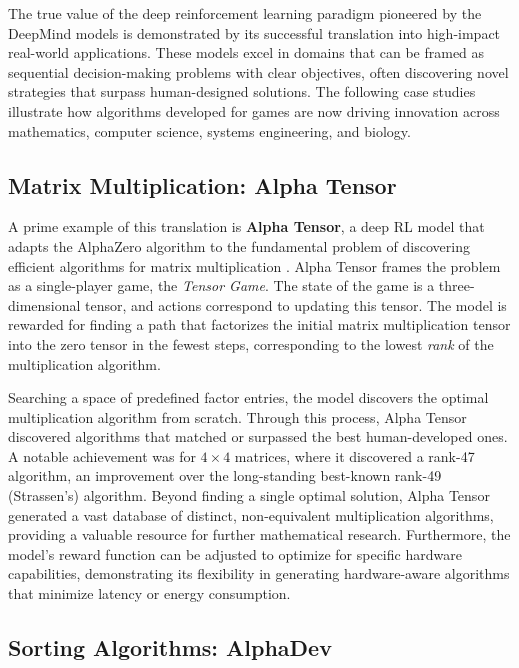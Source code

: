 
\label{sec:applications}

The true value of the deep reinforcement learning paradigm pioneered by the DeepMind models is demonstrated by its successful translation into high-impact real-world applications. These models excel in domains that can be framed as sequential decision-making problems with clear objectives, often discovering novel strategies that surpass human-designed solutions. The following case studies illustrate how algorithms developed for games are now driving innovation across mathematics, computer science, systems engineering, and biology.

\subsection{Matrix Multiplication: Alpha Tensor}
\label{subsec:alphatensor}

A prime example of this translation is \textbf{Alpha Tensor}, a deep RL model that adapts the AlphaZero algorithm to the fundamental problem of discovering efficient algorithms for matrix multiplication \cite{fawzi2022discovering}. Alpha Tensor frames the problem as a single-player game, the \textit{Tensor Game}. The state of the game is a three-dimensional tensor, and actions correspond to updating this tensor. The model is rewarded for finding a path that factorizes the initial matrix multiplication tensor into the zero tensor in the fewest steps, corresponding to the lowest \textit{rank} of the multiplication algorithm.

Searching a space of predefined factor entries, the model discovers the optimal multiplication algorithm from scratch. Through this process, Alpha Tensor discovered algorithms that matched or surpassed the best human-developed ones. A notable achievement was for $4 \times 4$ matrices, where it discovered a rank-47 algorithm, an improvement over the long-standing best-known rank-49 (Strassen's) algorithm. Beyond finding a single optimal solution, Alpha Tensor generated a vast database of distinct, non-equivalent multiplication algorithms, providing a valuable resource for further mathematical research. Furthermore, the model's reward function can be adjusted to optimize for specific hardware capabilities, demonstrating its flexibility in generating hardware-aware algorithms that minimize latency or energy consumption.

\subsection{Sorting Algorithms: AlphaDev}
\label{subsec:alphadev}

